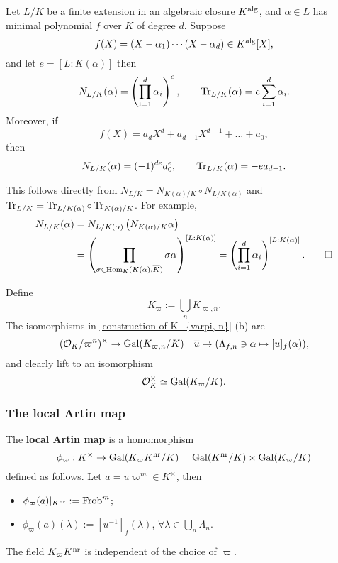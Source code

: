 \begin{lemma}\label{compute norm and trace from minimal polynomial}
    Let $L/K$ be a finite extension in an algebraic closure $K^{\mathrm{alg}}$, and $\alpha\in L$ has minimal polynomial $f$ over $K$ of degree $d$. Suppose \[f(X) = (X-\alpha_1)\cdots(X-\alpha_d)\in K^{\mathrm{alg}}[X],\] and let $e = [L : K(\alpha)]$
    then \[N_{L/K}(\alpha) = \left(\prod_{i = 1}^d \alpha_i\right)^e,\qquad \operatorname{Tr}_{L/K}(\alpha) = e\sum_{i = 1}^d \alpha_i.\]
    Moreover, if \[f(X) = a_dX^d + a_{d-1}X^{d-1} + \dots + a_0,\]then \[N_{L/K}(\alpha) = (-1)^{de}a_0^e,\qquad \operatorname{Tr}_{L/K}(\alpha) = -ea_{d-1}.\]
\end{lemma}
\begin{remark}
    This follows directly from $N_{L/K} = N_{K(\alpha)/K}\circ N_{L/K(\alpha)}$ and $\operatorname{Tr}_{L/K} = \operatorname{Tr}_{L/K(\alpha)}\circ \operatorname{Tr}_{K(\alpha)/K}$.
    For example,
    \begin{align*}
        N_{L/K}(\alpha) &= N_{L/K(\alpha)}\left( N_{K(\alpha)/K}\alpha \right)\\ &
        = \left( \prod_{\sigma\in\operatorname{Hom}_{K}(K(\alpha), \overline K)}\sigma\alpha \right)^{[L : K(\alpha)]} = \left( \prod_{i=1}^d\alpha_i  \right)^{[L : K(\alpha)]}.\qedhere
    \end{align*}
\end{remark}


Define \[K_\varpi := \bigcup_{n} K_{\varpi, n}.\]
The isomorphisms in \cref{construction of K_{varpi, n}} (b) are
\[(\mathcal{O}_K/\varpi^n)^\times\to \operatorname{Gal}(K_{\varpi, n}/K)\quad \overline{u}\mapsto (\Lambda_{f, n}\ni \alpha\mapsto [u]_f(\alpha)),\]
and clearly lift to an isomorphism
\[\mathcal{O}_K^\times\simeq \operatorname{Gal}(K_\varpi/K).\]

\subsubsection*{The local Artin map}
The \textbf{local Artin map} is a homomorphism \[\phi_\varpi : K^\times\to \operatorname{Gal}(K_\varpi K^{\mathrm{nr}}/K) = \operatorname{Gal}(K^{\mathrm{nr}}/K)\times \operatorname{Gal}(K_\varpi/K)\] defined as follows.
Let $a = u\varpi^m\in K^\times$, then 
\begin{itemize}
    \item $\phi_\varpi(a)|_{K^{\mathrm{nr}}} := \operatorname{Frob}^m$;
    \item $\phi_\varpi(a)(\lambda) := [u^{-1}]_f(\lambda)$, $\forall \lambda\in\bigcup_n\Lambda_n$.
\end{itemize}

\begin{theorem}
    The field $K_{\varpi}K^{\mathrm{nr}}$ is independent of the choice of $\varpi$.
\end{theorem}


